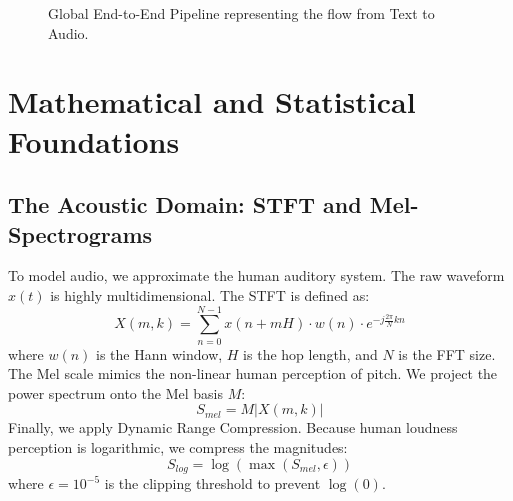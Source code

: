 \documentclass[12pt]{article}
\begin{document}
\begin{figure}[H]
\centering
{}
\caption{Global End-to-End Pipeline representing the flow from Text to Audio.}
\end{figure}

\section{Mathematical and Statistical Foundations}

\subsection{The Acoustic Domain: STFT and Mel-Spectrograms}
To model audio, we approximate the human auditory system. The raw waveform $x(t)$ is highly multidimensional. The STFT is defined as:
\begin{equation}
X(m, k) = \sum_{n=0}^{N-1} x(n + mH) \cdot w(n) \cdot e^{-j \frac{2\pi}{N} kn}
\end{equation}
where $w(n)$ is the Hann window, $H$ is the hop length, and $N$ is the FFT size. 
The Mel scale mimics the non-linear human perception of pitch. We project the power spectrum onto the Mel basis $M$:
\begin{equation}
S_{mel} = M |X(m, k)|
\end{equation}
Finally, we apply Dynamic Range Compression. Because human loudness perception is logarithmic, we compress the magnitudes:
\begin{equation}
S_{log} = \log\left( \max(S_{mel}, \epsilon) \right)
\end{equation}
where $\epsilon = 10^{-5}$ is the clipping threshold to prevent $\log(0)$.
\end{document}
